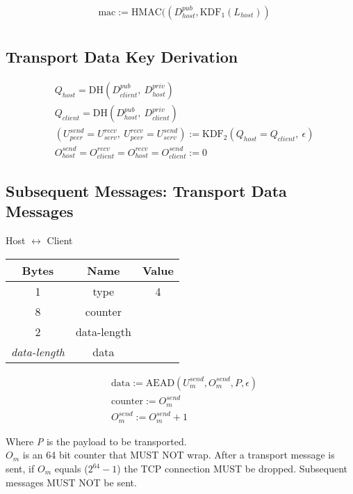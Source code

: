 \begin{align*}
    & \text{mac} := \text{HMAC}((D_{host}^{pub},\text{KDF}_1(L_{host}))\\
\end{align*}

\subsection{Transport Data Key Derivation}

\begin{align*}
    & Q_{host} = \text{DH}(D_{client}^{pub},\ D_{host}^{priv})\\
    & Q_{client} = \text{DH}(D_{host}^{pub},\ D_{client}^{priv})\\
    & (U_{peer}^{send} = U_{serv}^{recv},\ U_{peer}^{recv} = U_{serv}^{send}) := \text{KDF}_2(Q_{host} = Q_{client},
    \ \epsilon) \\
    & O_{host}^{send} = O_{client}^{recv} = O_{host}^{recv} = O_{client}^{send} := 0
\end{align*}

\subsection{Subsequent Messages: Transport Data Messages}

\begin{center}
    Host $\leftrightarrow$ Client\\
    \begin{tabular}{|c|c|c|}
        \hline
        \textbf{Bytes}     & \textbf{Name} & \textbf{Value} \\
        \hline
        1                  & type          & 4              \\
        \hline
        8                  & counter       &                \\
        \hline
        2                  & data-length   &                \\
        \hline
        \emph{data-length} & data          &                \\
        \hline
    \end{tabular}
\end{center}

\begin{align*}
    & \text{data} := \text{AEAD}(U_{m}^{send}, O_{m}^{send}, P, \epsilon)\\
    & \text{counter} := O_{m}^{send}\\
    & O_{m}^{send} := O_{m}^{send} + 1
\end{align*}


Where \emph{P} is the payload to be transported.\\

$O_{m}$ is an 64 bit counter that MUST NOT wrap. After a transport message is sent, if $O_{m}$ equals
($2^{64}-1$) the TCP connection MUST be dropped. Subsequent messages MUST NOT be sent. \\

